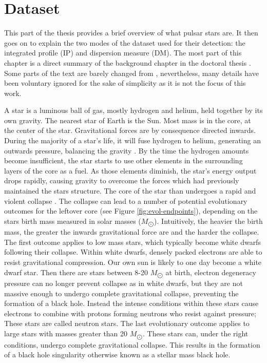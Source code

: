 \chapter{Dataset}\label{chapter-dataset} 

This part of the thesis provides a brief overview of what pulsar stars are. It then goes on to explain the two modes of the dataset used for their detection: the integrated profile (IP) and dispersion measure (DM). The most part of this chapter is a direct summary of the background chapter in the doctoral thesis \citep{lyon}. Some parts of the text are barely changed from \citep{lyon}, nevertheless, many details have been voluntary ignored for the sake of simplicity as it is not the focus of this work. 

A star is a luminous ball of gas, mostly hydrogen and helium, held together by its own gravity. The nearest star of Earth is the Sun. Most mass is in the core, at the center of the star. Gravitational forces are by consequence directed inwards. During the majority of a star's life, it will fuse hydrogen to helium, generating an outwards pressure, balancing the gravity \citep{ghosh}. By the time the hydrogen amounts become insufficient, the star starts to use other elements in the surrounding layers of the core as a fuel. As those elements diminish, the star's energy output drops rapidly, causing gravity to overcome the forces which had previously maintained the stars structure. The core of the star than undergoes a rapid and violent collapse \citep{ghosh}. The collapse can lead to a number of potential evolutionary outcomes for the leftover core (see Figure \ref{fig:evol-endpoints}), depending on the stars birth mass measured in solar masses ($M_{\bigodot}$). Intuitively, the heavier the birth mass, the greater the inwards gravitational force are and the harder the collapse. The first outcome applies to low mass stars, which typically become white dwarfs following their collapse. Within white dwarfs, densely packed electrons are able to resist gravitational compression. Our own sun is likely to one day become a white dwarf star. Then there are stars between 8-20 $M_{\bigodot}$ at birth, electron degeneracy pressure can no longer prevent collapse as in white dwarfs, but they are not massive enough to undergo complete gravitational collapse, preventing the formation of a black hole. Instead the intense conditions within these stars cause electrons to combine with protons forming neutrons who resist against pressure; These stars are called neutron stars. The last evolutionary outcome applies to large stars with masses greater than 20 $M_{\bigodot}$. These stars can, under the right conditions, undergo complete gravitational collapse. This results in the formation of a black hole singularity otherwise known as a stellar mass black hole. 
